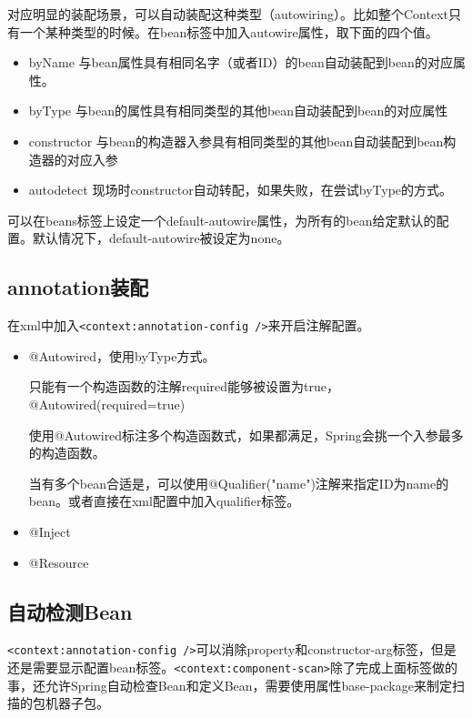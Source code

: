 对应明显的装配场景，可以自动装配这种类型（autowiring）。比如整个Context只有一个某种类型的时候。在bean标签中加入autowire属性，取下面的四个值。

\begin{itemize}
\item byName 与bean属性具有相同名字（或者ID）的bean自动装配到bean的对应属性。
\item byType 与bean的属性具有相同类型的其他bean自动装配到bean的对应属性
\item constructor 与bean的构造器入参具有相同类型的其他bean自动装配到bean构造器的对应入参
\item autodetect 现场时constructor自动转配，如果失败，在尝试byType的方式。
\end{itemize}

可以在beans标签上设定一个default-autowire属性，为所有的bean给定默认的配置。默认情况下，default-autowire被设定为none。


\subsection{annotation装配}

在xml中加入\lstinline$<context:annotation-config />$来开启注解配置。

\begin{itemize}
\item @Autowired，使用byType方式。

只能有一个构造函数的注解required能够被设置为true，@Autowired(required=true)

使用@Autowired标注多个构造函数式，如果都满足，Spring会挑一个入参最多的构造函数。

当有多个bean合适是，可以使用@Qualifier("name")注解来指定ID为name的bean。或者直接在xml配置中加入qualifier标签。



\item @Inject
\item @Resource
\end{itemize}


\subsection{自动检测Bean}

\lstinline$<context:annotation-config />$可以消除property和constructor-arg标签，但是还是需要显示配置bean标签。\lstinline$<context:component-scan>$除了完成上面标签做的事，还允许Spring自动检查Bean和定义Bean，需要使用属性base-package来制定扫描的包机器子包。

